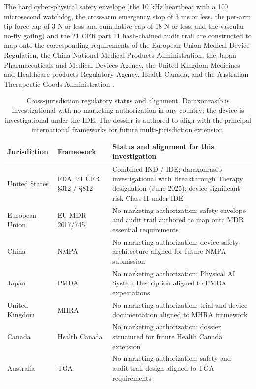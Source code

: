 The
hard cyber-physical safety envelope (the 10 kHz heartbeat with a 100 microsecond
watchdog, the cross-arm emergency stop of 3 ms or less, the per-arm tip-force cap of
3 N or less and cumulative cap of 18 N or less, and the vascular no-fly gating) and
the 21 CFR part 11 hash-chained audit trail are constructed to map onto the
corresponding requirements of the European Union Medical Device Regulation, the
China National Medical Products Administration, the Japan Pharmaceuticals and
Medical Devices Agency, the United Kingdom Medicines and Healthcare products
Regulatory Agency, Health Canada, and the Australian Therapeutic Goods
Administration \cite{natlpaiplatf, cfr312paiuni}.

\begin{table}[t]
\caption{Cross-jurisdiction regulatory status and alignment. Daraxonrasib is
investigational with no marketing authorization in any country; the device is
investigational under the IDE. The dossier is authored to align with the principal
international frameworks for future multi-jurisdiction extension.}
\label{tab:sec02-jurisdiction}
\centering
\begin{tabularx}{\textwidth}{L{2.6cm} L{3.4cm} Y}
\toprule
\textbf{Jurisdiction} & \textbf{Framework} & \textbf{Status and alignment for this investigation} \\
\midrule
United States & FDA, 21 CFR \S 312 / \S 812 & Combined IND / IDE; daraxonrasib investigational with Breakthrough Therapy designation (June 2025); device significant-risk Class II under IDE \\
European Union & EU MDR 2017/745 & No marketing authorization; safety envelope and audit trail authored to map onto MDR essential requirements \\
China & NMPA & No marketing authorization; device safety architecture aligned for future NMPA submission \\
Japan & PMDA & No marketing authorization; Physical AI System Description aligned to PMDA expectations \\
United Kingdom & MHRA & No marketing authorization; trial and device documentation aligned to MHRA framework \\
Canada & Health Canada & No marketing authorization; dossier structured for future Health Canada extension \\
Australia & TGA & No marketing authorization; safety and audit-trail design aligned to TGA requirements \\
\bottomrule
\end{tabularx}
\end{table}
\vspace*{-1.35cm}

